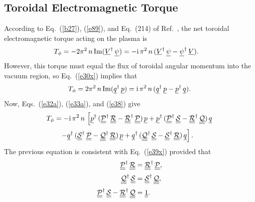 \documentclass[12pt,prb,aps]{revtex4-1}
\begin{document}
\subsection{Toroidal Electromagnetic Torque}
According to Eq.~(\ref{b27}), (\ref{e89}), and Eq.~(214) of Ref.~, 
the net toroidal electromagnetic torque acting on the plasma  is
\begin{align}\label{e38}
T_\phi&= -2\pi^2\,n\,{\rm Im}(\underline{V}^\dag\,\underline{\psi})= -{\rm i}\,\pi^2\,n\,(\underline{V}^\dag\,\underline{\psi}-\underline{\psi}^\dag\,\underline{V}).
\end{align}
However, this torque must equal the flux of toroidal angular momentum into the vacuum region, so Eq.~(\ref{e30x}) implies that
\begin{equation}\label{e39x}
T_\phi= 2\pi^2\,n\,{\rm Im}(\underline{q}^\dag\,\underline{p})={\rm i}\, \pi^2\,n\,(\underline{q}^\dag\,\underline{p}- \underline{p}^\dag\,\underline{q}).
\end{equation}
Now, Eqs.~(\ref{e32a}), (\ref{e33a}), and (\ref{e38}) give 
\begin{align}
T_\phi&= -{\rm i}\,\pi^2\,n\,\left[
\underline{p}^\dag\,(\underline{\underline{\cal P}}^\dag\,\underline{\underline{\cal R}}
- \underline{\underline{\cal R}}^\dag\,\underline{\underline{\cal P}})\,\underline{p}
+\underline{p}^\dag\,(\underline{\underline{\cal P}}^\dag\,\underline{\underline{\cal S}}
-\underline{\underline{\cal R}}^\dag\,\underline{\underline{\cal Q}})\,\underline{q}\right.\nonumber\\[0.5ex]
&\phantom{=}\left.- \underline{q}^\dag\,(\underline{\underline{\cal S}}^\dag\,\underline{\underline{\cal P}}
- \underline{\underline{\cal Q}}^\dag\,\underline{\underline{\cal R}})\,\underline{p}
+\underline{q}^\dag\,(\underline{\underline{\cal Q}}^\dag\,\underline{\underline{\cal S}}
- \underline{\underline{\cal S}}^\dag\,\underline{\underline{\cal R}})\,\underline{q}
\right].
\end{align}
The previous equation is consistent with Eq.~(\ref{e39x}) provided that
\begin{align}\label{e41x}
\underline{\underline{\cal P}}^\dag\,\underline{\underline{\cal R}}&= \underline{\underline{\cal R}}^\dag\,\underline{\underline{\cal P}},\\[0.5ex]
\underline{\underline{\cal Q}}^\dag\,\underline{\underline{\cal S}}&= \underline{\underline{\cal S}}^\dag\,\underline{\underline{\cal Q}},\label{e42x}\\[0.5ex]
\underline{\underline{\cal P}}^\dag\,\underline{\underline{\cal S}}- \underline{\underline{\cal R}}^\dag\,\underline{\underline{\cal Q}}&=\underline{\underline{1}}.\label{e43}
\end{align}
\end{document}
